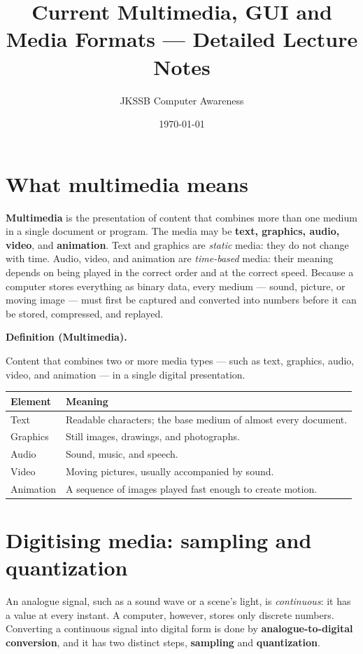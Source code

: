 \documentclass[11pt]{article}
\title{Current Multimedia, GUI and Media Formats --- Detailed Lecture Notes}
\author{JKSSB Computer Awareness}
\date{\today}
\newenvironment{definitionbox}[1]{%
  \par\noindent\textbf{Definition (#1).}\ \itshape
}{\par\vspace{0.3em}}
\begin{document}
\maketitle

\section{What multimedia means}
\textbf{Multimedia} is the presentation of content that combines more than
one medium in a single document or program. The media may be \textbf{text,
graphics, audio, video}, and \textbf{animation}. Text and graphics are
\emph{static} media: they do not change with time. Audio, video, and animation
are \emph{time-based} media: their meaning depends on being played in the
correct order and at the correct speed. Because a computer stores everything
as binary data, every medium --- sound, picture, or moving image --- must
first be captured and converted into numbers before it can be stored,
compressed, and replayed.

\begin{definitionbox}{Multimedia}
Content that combines two or more media types --- such as text, graphics,
audio, video, and animation --- in a single digital presentation.
\end{definitionbox}

\begin{center}
\begin{tabular}{p{}p{}}
\toprule
\textbf{Element} & \textbf{Meaning} \\
\midrule
Text & Readable characters; the base medium of almost every document. \\
Graphics & Still images, drawings, and photographs. \\
Audio & Sound, music, and speech. \\
Video & Moving pictures, usually accompanied by sound. \\
Animation & A sequence of images played fast enough to create motion. \\
\bottomrule
\end{tabular}
\end{center}

\section{Digitising media: sampling and quantization}
An analogue signal, such as a sound wave or a scene's light, is
\emph{continuous}: it has a value at every instant. A computer, however,
stores only discrete numbers. Converting a continuous signal into digital
form is done by \textbf{analogue-to-digital conversion}, and it has two
distinct steps, \textbf{sampling} and \textbf{quantization}.
\end{document}
